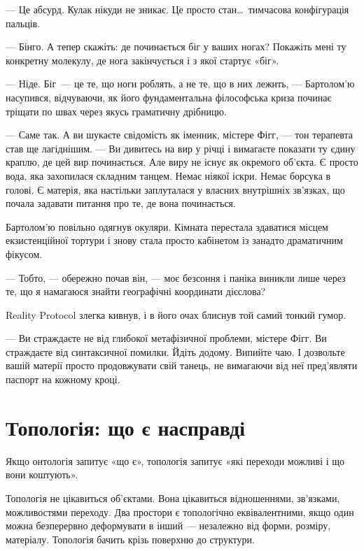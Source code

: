 \documentclass[12pt, a4paper, openany]{book}
\begin{document}
\begin{realitybox}
--- Це абсурд. Кулак нікуди не зникає. Це просто стан\ldots\ тимчасова конфігурація пальців.

--- Бінго. А тепер скажіть: де починається біг у ваших ногах? Покажіть мені ту конкретну молекулу, де нога закінчується і з якої стартує «біг».

--- Ніде. Біг~--- це те, що ноги роблять, а не те, що в них лежить, --- Бартолом'ю насупився, відчуваючи, як його фундаментальна філософська криза починає тріщати по швах через якусь граматичну дрібницю.

--- Саме так. А ви шукаєте свідомість як іменник, містере Фігг, --- тон терапевта став ще лагіднішим. --- Ви дивитесь на вир у річці і вимагаєте показати ту єдину краплю, де цей вир починається. Але виру не існує як окремого об'єкта. Є просто вода, яка захопилася складним танцем. Немає ніякої іскри. Немає борсука в голові. Є матерія, яка настільки заплуталася у власних внутрішніх зв'язках, що почала задавати питання про те, де вона починається.

\medskip
Бартолом'ю повільно одягнув окуляри. Кімната перестала здаватися місцем екзистенційної тортури і знову стала просто кабінетом із занадто драматичним фікусом.

--- Тобто, --- обережно почав він, --- моє безсоння і паніка виникли лише через те, що я намагаюся знайти географічні координати дієслова?

Reality Protocol злегка кивнув, і в його очах блиснув той самий тонкий гумор.

--- Ви страждаєте не від глибокої метафізичної проблеми, містере Фігг. Ви страждаєте від синтаксичної помилки. Йдіть додому. Випийте чаю. І дозвольте вашій матерії просто продовжувати свій танець, не вимагаючи від неї пред'являти паспорт на кожному кроці.
\end{realitybox}

\section{Топологія: що є насправді}

Якщо онтологія запитує «що є», топологія запитує «які переходи можливі і що вони коштують».

Топологія не цікавиться об'єктами. Вона цікавиться відношеннями, зв'язками, можливостями переходу. Два простори є топологічно еквівалентними, якщо один можна безперервно деформувати в інший — незалежно від форми, розміру, матеріалу. Топологія бачить крізь поверхню до структури.
\end{document}
